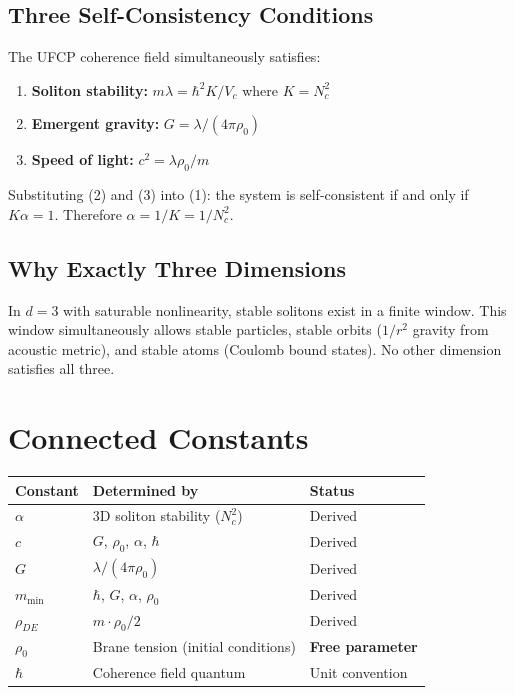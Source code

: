 \documentclass[11pt, a4paper]{article}
\begin{document}
\subsection{Three Self-Consistency Conditions}

The UFCP coherence field simultaneously satisfies:
\begin{enumerate}
  \item \textbf{Soliton stability:}
    $m\lambda = \hbar^2 K / V_c$ where $K = N_c^2$
  \item \textbf{Emergent gravity:}
    $G = \lambda / (4\pi\rho_0)$
  \item \textbf{Speed of light:}
    $c^2 = \lambda\rho_0 / m$
\end{enumerate}

Substituting (2) and (3) into (1): the system is self-consistent
if and only if $K\alpha = 1$. Therefore $\alpha = 1/K = 1/N_c^2$.

\subsection{Why Exactly Three Dimensions}

In $d = 3$ with saturable nonlinearity, stable solitons exist in a
finite window. This window simultaneously allows stable particles,
stable orbits ($1/r^2$ gravity from acoustic metric), and stable
atoms (Coulomb bound states). No other dimension satisfies all three.

\section{Connected Constants}

\begin{center}
\begin{tabular}{@{}lll@{}}
\toprule
\textbf{Constant} & \textbf{Determined by} & \textbf{Status} \\
\midrule
$\alpha$ & 3D soliton stability ($N_c^2$) & Derived \\
$c$ & $G$, $\rho_0$, $\alpha$, $\hbar$ & Derived \\
$G$ & $\lambda/(4\pi\rho_0)$ & Derived \\
$m_{\min}$ & $\hbar$, $G$, $\alpha$, $\rho_0$ & Derived \\
$\rho_{DE}$ & $m \cdot \rho_0 / 2$ & Derived \\
$\rho_0$ & Brane tension (initial conditions) & \textbf{Free parameter} \\
$\hbar$ & Coherence field quantum & Unit convention \\
\bottomrule
\end{tabular}
\end{center}
\end{document}

